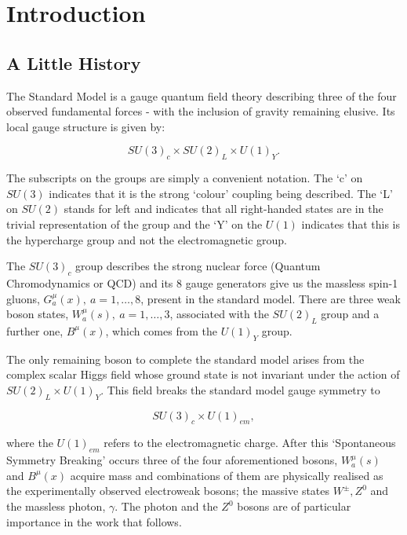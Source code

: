 
\chapter{Introduction}

	\label{chap:intro}

\section{A Little History}
	\label{sec:history}

	The Standard Model is a gauge quantum field theory describing three of the four observed
	fundamental forces - with the inclusion of gravity remaining elusive.
	Its local gauge structure is given by:

	\begin{equation}
		SU(3)_c\times SU(2)_L\times U(1)_Y.
		\label{eq:SMGauge}
	\end{equation}

	The subscripts on the groups are simply a convenient notation.  The `c' on $SU(3)$ indicates
	that it is the strong `colour' coupling being described.  The `L' on $SU(2)$ stands for left and indicates that
	all right-handed states are in the trivial representation of the group and the `Y' on the
	$U(1)$ indicates that this is the hypercharge group and not the electromagnetic group.

	The $SU(3)_c$ group describes the strong nuclear force (Quantum Chromodynamics or QCD) and its
	8 gauge generators give us the massless spin-1 gluons, $G_a^\mu(x),\ a=1,\ldots,8$, present
	in the standard model. There are three weak boson states, $W_a^\mu(s),\ a=1,\ldots,3$, associated
	with the $SU(2)_L$ group and a further one, $B^\mu(x)$, which comes from the $U(1)_Y$ group.

	The only remaining boson to complete the standard model arises from the complex scalar Higgs
	field whose ground state is not invariant under the action of $SU(2)_L\times U(1)_Y$. This
	field breaks the standard model gauge symmetry to

	\begin{equation}
		SU(3)_c\times U(1)_{em},
		\label{eq:SMGaugeBroken}
	\end{equation}

	\noindent where the $U(1)_{em}$ refers to the electromagnetic charge.  After this `Spontaneous
	Symmetry Breaking' occurs three of the four aforementioned bosons, $W_a^\mu(s)$ and $B^\mu(x)$
	acquire mass and combinations of them are physically realised as the experimentally observed
	electroweak bosons; the massive states $W^\pm, Z^0$ and the massless photon, $\gamma$.
	The photon and the $Z^0$ bosons are of particular importance in the work that follows.

